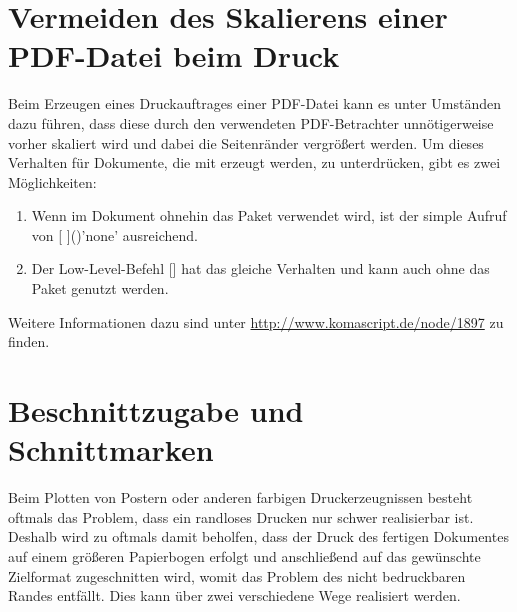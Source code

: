 \section{Vermeiden des Skalierens einer PDF-Datei beim Druck}
%
Beim Erzeugen eines Druckauftrages einer PDF-Datei kann es unter Umständen dazu 
führen, dass diese durch den verwendeten PDF-Betrachter unnötigerweise vorher 
skaliert wird und dabei die Seitenränder vergrößert werden. Um dieses Verhalten 
für Dokumente, die mit  erzeugt werden, zu unterdrücken, gibt es 
zwei Möglichkeiten:
%
\begin{enumerate}
\item Wenn im Dokument ohnehin das Paket  verwendet wird, 
  ist der simple Aufruf von
  [%
  ]()'none'
  ausreichend.
\item Der Low-Level-Befehl
  []
  hat das gleiche Verhalten und kann auch ohne das Paket  
  genutzt werden.
\end{enumerate}
%
Weitere Informationen dazu sind unter \url{http://www.komascript.de/node/1897} 
zu finden.


\section{Beschnittzugabe und Schnittmarken}
%
%
%
%
Beim Plotten von Postern oder anderen farbigen Druckerzeugnissen besteht 
oftmals das Problem, dass ein randloses Drucken nur schwer realisierbar ist. 
Deshalb wird zu oftmals damit beholfen, dass der Druck des fertigen Dokumentes 
auf einem größeren Papierbogen erfolgt und anschließend auf das gewünschte 
Zielformat zugeschnitten wird, womit das Problem des nicht bedruckbaren Randes 
entfällt. Dies kann über zwei verschiedene Wege realisiert werden.

